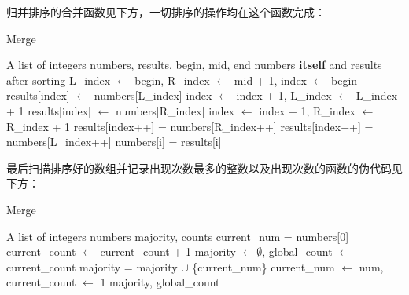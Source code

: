 \documentclass[UTF8,12pt,a4paper]{ctexart}
\begin{document}
归并排序的合并函数见下方，一切排序的操作均在这个函数完成：
\begin{algorithm}[H]
	\caption{Merge}
	\begin{algorithmic}[1]
	\Require A list of integers $\text{numbers}$, results, begin, mid, end
	\Ensure numbers \textbf{itself} and results after sorting
	\State L\_index $\gets$ begin, R\_index $\gets$ mid + 1, index $\gets$ begin
			\State results[index] $\gets$ numbers[L\_index]
			\State index $\gets$ index + 1, L\_index $\gets$ L\_index + 1
		\EndIf
			\State results[index] $\gets$ numbers[R\_index]
			\State index $\gets$ index + 1, R\_index $\gets$ R\_index + 1
		\EndIf
	\EndWhile
		\State results[index++] = numbers[R\_index++]
	\EndWhile
		\State results[index++] = numbers[L\_index++]
	\EndWhile
		\State numbers[i] = results[i]
	\EndFor
\end{algorithmic}
\end{algorithm}

最后扫描排序好的数组并记录出现次数最多的整数以及出现次数的函数的伪代码见下方：
\begin{algorithm}[H]
	\caption{Merge}
	\begin{algorithmic}[1]
	\Require A list of integers $\text{numbers}$
	\Ensure majority, counts
	\State current\_num = numbers[0]
			\State current\_count $\gets$ current\_count + 1
		\Else
			\State majority $\gets \emptyset$, global\_count $\gets$ current\_count
			\Else
			\State majority = majority $\cup$ \{current\_num\}
			\EndIf
			\State current\_num $\gets$ num, current\_count $\gets$ 1
		\EndIf
	\EndFor
	\Return majority, global\_count
\end{algorithmic}
\end{algorithm}
\end{document}

